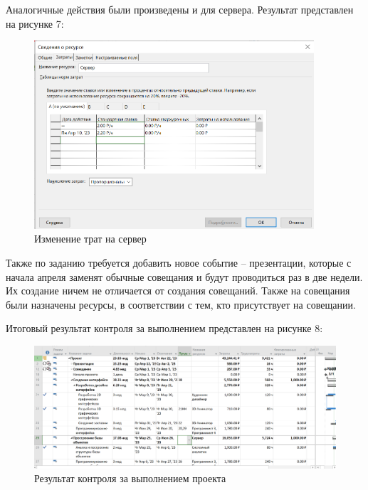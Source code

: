 Аналогичные действия были произведены и для сервера. 
Результат представлен на рисунке 7:
\FloatBarrier
\begin{figure}[h]	
	\begin{center}
		\includegraphics[height=7cm]{inc/server.png}
	\end{center}
	\captionsetup{justification=centering}
	\caption{Изменение трат на сервер}
\end{figure}
\FloatBarrier 
\newpage

Также по заданию требуется добавить новое событие -- презентации, которые с начала апреля заменят обычные совещания и будут проводиться раз в две недели.
Их создание ничем не отличается от создания совещаний.
Также на совещания были назначены ресурсы, в соответствии с тем, кто присутствует на совещании.

Итоговый результат контроля за выполнением представлен на рисунке 8:
\FloatBarrier
\begin{figure}[h]	
	\begin{center}
		\includegraphics[width=\linewidth]{inc/profit.png}
	\end{center}
	\captionsetup{justification=centering}
	\caption{Результат контроля за выполнением проекта}
\end{figure}
\FloatBarrier 

